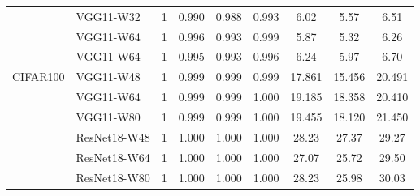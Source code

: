 \begin{table}[h]
\begin{center}
\begin{tabular}{llccccccc}
         & VGG11-W32        & 1            & 0.990       & 0.988       & 0.993       & 6.02         & 5.57         & 6.51        \\
         & VGG11-W64        & 1            & 0.996       & 0.993       & 0.999       & 5.87         & 5.32         & 6.26        \\
         & VGG11-W64        & 1            & 0.995       & 0.993       & 0.996       & 6.24         & 5.97         & 6.70        \\
\midrule
CIFAR100 & VGG11-W48        & 1            & 0.999       & 0.999       & 0.999       & 17.861       & 15.456       & 20.491      \\
         & VGG11-W64        & 1            & 0.999       & 0.999       & 1.000       & 19.185       & 18.358       & 20.410      \\
         & VGG11-W80        & 1            & 0.999       & 0.999       & 1.000       & 19.455       & 18.120       & 21.450      \\
         & ResNet18-W48     & 1            & 1.000       & 1.000       & 1.000       & 28.23        & 27.37        & 29.27       \\
         & ResNet18-W64     & 1            & 1.000       & 1.000       & 1.000       & 27.07        & 25.72        & 29.50       \\
         & ResNet18-W80     & 1            & 1.000       & 1.000       & 1.000       & 28.23        & 25.98        & 30.03      \\\bottomrule
\end{tabular}
\end{center}
  \label{tab:appendix_xxT_spec_fc}%
\end{table}
\newpage

